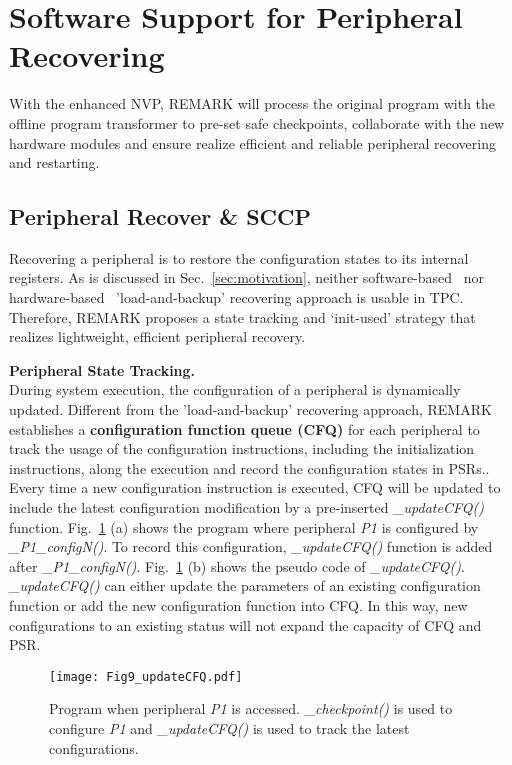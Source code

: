 \section{Software Support for Peripheral Recovering} \label{sec:offline}
%
With the enhanced NVP, REMARK will process the original program with the offline program transformer to pre-set safe checkpoints, collaborate with the new hardware modules and ensure realize efficient and reliable peripheral recovering and restarting.

\subsection{Peripheral Recover \& SCCP}	\label{sec:offlinePeriRec}
%
Recovering a peripheral is to restore the configuration states to its internal registers.
As is discussed in Sec.~\ref{sec:motivation}, neither software-based~\cite{jayakumar2014quickrecall} nor hardware-based~\cite{li2016hw} 'load-and-backup' recovering approach is usable in TPC.
Therefore, REMARK proposes a state tracking and `init-used' strategy that realizes lightweight, efficient peripheral recovery.

\noindent\textbf{Peripheral State Tracking.} \\
%
During system execution, the configuration of a peripheral is dynamically updated. 
Different from the 'load-and-backup' recovering approach, REMARK establishes a \textbf{configuration function queue (CFQ)} for each peripheral to track the usage of the configuration instructions, including the initialization instructions, along the execution and record the configuration states in PSRs.. 
Every time a new configuration instruction is executed, CFQ will be updated to include the latest configuration modification by a pre-inserted \emph{\_updateCFQ()} function.
Fig.~\ref{fig:updateCFQ} (a) shows the program where peripheral \emph{P1} is configured by \emph{\_P1\_configN()}.
To record this configuration, \emph{\_updateCFQ()} function is added after \emph{\_P1\_configN()}.
Fig.~\ref{fig:updateCFQ} (b) shows the pseudo code of \emph{\_updateCFQ()}.
\emph{\_updateCFQ()} can either update the parameters of an existing configuration function or add the new configuration function into CFQ.
In this way, new configurations to an existing status will not expand the capacity of CFQ and PSR.

%
\begin{figure}[t]
    \centering
    \texttt{[image: Fig9\_updateCFQ.pdf]}
    \caption{Program when peripheral \emph{P1} is accessed. \emph{\_checkpoint()} is used to configure \emph{P1} and \emph{\_updateCFQ()} is used to track the latest configurations.}
    \label{fig:updateCFQ}
\end{figure}

